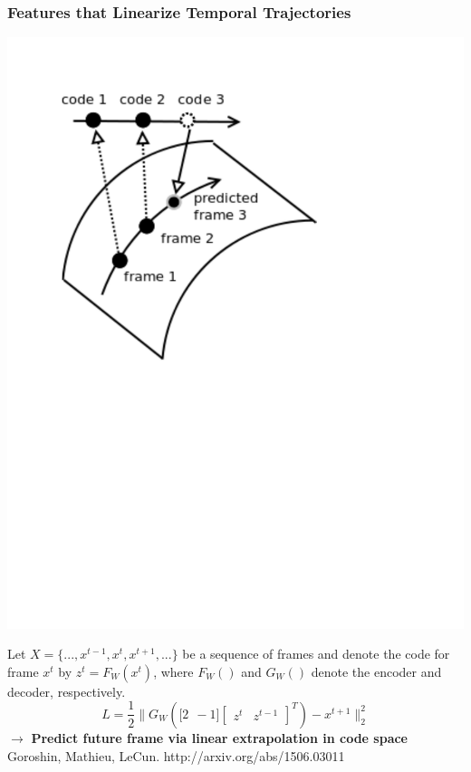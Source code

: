 \documentclass{beamer}
\begin{document}
\begin{frame} 
\frametitle{Features that Linearize Temporal Trajectories}
\begin{center} 
\includegraphics[scale=0.27, trim= 15 350 200 39, clip]{./Figures/Project2/linearize_manifold.pdf} 
\end{center} 
Let $X = \{...,x^{t-1},x^t,x^{t+1},...\}$ be a sequence of frames and denote the code for frame $x^t$ by $z^t = F_W(x^t)$, 
where $F_W()$ and $G_W()$ denote the encoder and decoder, respectively. \\
\begin{equation}
\nonumber
L = \frac{1}{2}\| G_W(\mathbf [2 ~~-1] \begin{bmatrix}z^t&z^{t-1}\end{bmatrix}^T) - x^{t+1} \|^2_2
\label{eqn:loss} 
\end{equation} 
$\rightarrow$ \textbf{Predict future frame via linear extrapolation in code space}
\tiny{Goroshin, Mathieu, LeCun. http://arxiv.org/abs/1506.03011} 
\end{frame} 
\end{document}
